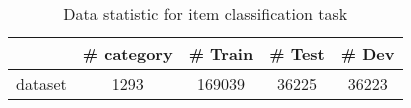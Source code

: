 \begin{table}[!hbpt]
    \centering
    \caption{Data statistic for  item classification task}
    \begin{tabular}{c |c | c | c |c}
    \toprule
         & \# category & \# Train & \# Test & \# Dev \\
         \midrule
        dataset  &1293  & 169039 & 36225 & 36223  \\
        \bottomrule
    \end{tabular}
    \label{data:classification}
\end{table}